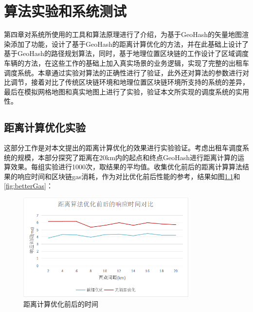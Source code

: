 \chapter{算法实验和系统测试}
第四章对系统所使用的工具和算法原理进行了介绍，为基于GeoHash的矢量地图渲染添加了功能，设计了基于GeoHash的距离计算优化的方法，并在此基础上设计了基于GeoHash的路径规划算法，同时，基于地理位置区块链的工作设计了区域调度车辆的方法，在这些工作的基础上加入真实场景的业务逻辑，实现了完整的出租车调度系统。本章通过实验对算法的正确性进行了验证，此外还对算法的参数进行对比调节，接着对比了传统区块链环境和地理位置区块链环境所支持的系统的差异，最后在模拟网格地图和真实地图上进行了实验，验证本文所实现的调度系统的实用性。

\section{距离计算优化实验}
这部分工作是对本文提出的距离计算优化的效果进行实验验证。考虑出租车调度系统的规模，本部分探究了距离在20km内的起点和终点GeoHash进行距离计算的运算效果。每组实验进行1000次，取结果的平均值。收集优化前后的距离计算算法结果的响应时间和区块链gas消耗，作为对比优化前后性能的参考，结果如图\ref{fig:betterDistance}和\ref{fig:betterGas}：

\begin{figure}[h]
  \centering
  \includegraphics[height=0.3\textheight,width=0.8\textwidth]{figures/距离计算优化时间}
  \caption{距离计算优化前后的时间}\label{fig:betterDistance}
\end{figure}


